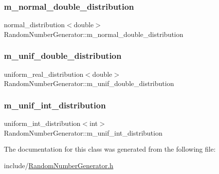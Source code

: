 \subsubsection{\texorpdfstring{m\_normal\_double\_distribution}{m\_normal\_double\_distribution}}
{\footnotesize\ttfamily normal\+\_\+distribution$<$double$>$ Random\+Number\+Generator\+::m\+\_\+normal\+\_\+double\+\_\+distribution\hspace{0.3cm}{\ttfamily [private]}}

\mbox{\label{class_random_number_generator_ab7697a4a0f3efe902aa49828bd78f1e2}} 
\subsubsection{\texorpdfstring{m\_unif\_double\_distribution}{m\_unif\_double\_distribution}}
{\footnotesize\ttfamily uniform\+\_\+real\+\_\+distribution$<$double$>$ Random\+Number\+Generator\+::m\+\_\+unif\+\_\+double\+\_\+distribution\hspace{0.3cm}{\ttfamily [private]}}

\mbox{\label{class_random_number_generator_a7a3a5b9bfbb1306f364704bc3a9860b6}} 
\subsubsection{\texorpdfstring{m\_unif\_int\_distribution}{m\_unif\_int\_distribution}}
{\footnotesize\ttfamily uniform\+\_\+int\+\_\+distribution$<$int$>$ Random\+Number\+Generator\+::m\+\_\+unif\+\_\+int\+\_\+distribution\hspace{0.3cm}{\ttfamily [private]}}



The documentation for this class was generated from the following file\+:\begin{DoxyCompactItemize}
\item 
include/\mbox{\hyperlink{_random_number_generator_8h}{Random\+Number\+Generator.\+h}}\end{DoxyCompactItemize}
